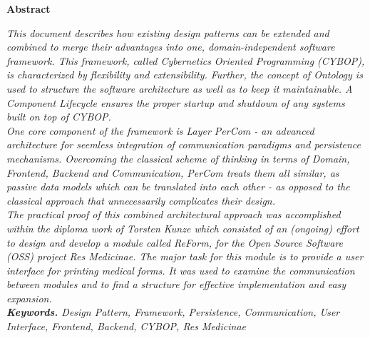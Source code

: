 \begin{center}\bf \large Abstract
\end{center}
\normalsize \it This document describes how existing design patterns can be extended and combined
to merge their advantages into one, domain-independent software framework. This framework, called
\emph{Cybernetics Oriented Programming} (CYBOP), is characterized by flexibility and extensibility.
Further, the concept of \emph{Ontology} is used to structure the software architecture as well as
to keep it maintainable. A \emph{Component Lifecycle} ensures the proper startup and shutdown of
any systems built on top of CYBOP.\\
One core component of the framework is \emph{Layer PerCom} - an advanced architecture for seemless
integration of communication paradigms and persistence mechanisms. Overcoming the classical scheme
of thinking in terms of \emph{Domain}, \emph{Frontend}, \emph{Backend} and \emph{Communication},
PerCom treats them all similar, as passive data models which can be translated into each other - as
opposed to the classical approach that unnecessarily complicates their design.\\
The practical proof of this combined architectural approach was accomplished
within the diploma work of Torsten Kunze \cite{Diplomarbeit_Torsten_Kunze} which
consisted of an (ongoing) effort to design and develop a module called \emph{ReForm},
for the \emph{Open Source Software} (OSS) project \emph{Res Medicinae}.
The major task for this module is to provide a user interface for printing medical
forms. It was used to examine the communication between modules and to find a
structure for effective implementation and easy expansion.\\
\textbf{Keywords.} Design Pattern, Framework, Persistence, Communication, User Interface, Frontend,
Backend, CYBOP, Res Medicinae \rm
